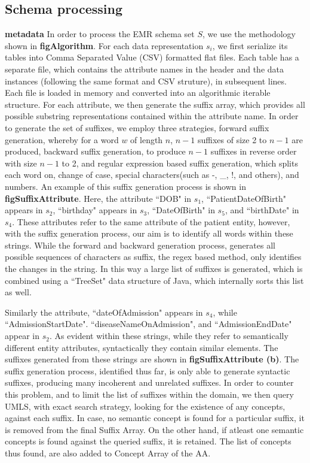 \subsection*{Schema processing}
\label{schema_prepro}
\textbf{metadata}
In order to process the EMR schema set $S$, we use the methodology shown in \textbf{figAlgorithm}. For each data representation $s_i$, we first serialize its tables into Comma Separated Value (CSV) formatted flat files. Each table has a separate file, which contains the attribute names in the header and the data instances (following the same format and CSV struture), in subsequent lines. Each file is loaded in memory and converted into an algorithmic iterable structure. For each attribute, we then generate the suffix array, which provides all possible substring representations contained within the attribute name. In order to generate the set of suffixes, we employ three strategies, forward suffix generation, whereby for a word $w$ of length $n$, $n-1$ suffixes of size 2 to $n-1$ are produced, backward suffix generation, to produce $n-1$ suffixes in reverse order with size $n-1$ to 2, and regular expression based suffix generation, which splits each word on, change of case, special characters(such as -, \_, !, and others), and numbers. An example of this suffix generation process is shown in \textbf{figSuffixAttribute}. 
Here, the attribute ``DOB" in $s_1$, ``PatientDateOfBirth" appears in $s_2$, ``birthday" appears in $s_3$, ``DateOfBirth" in $s_5$, and ``birthDate" in $s_4$. These attributes refer to the same attribute of the patient entity, however, with the suffix generation process, our aim is to identify all words within these strings. While the forward and backward generation process, generates all possible sequences of characters as suffix, the regex based method, only identifies the changes in the string. In this way a large list of suffixes is generated, which is combined using a ``TreeSet" data structure of Java, which internally sorts this list as well.

Similarly the attribute, ``dateOfAdmission" appears in $s_4$, while ``AdmissionStartDate". ``diseaseNameOnAdmission", and ``AdmissionEndDate" appear in $s_2$. As evident within these strings, while they refer to semantically different entity attributes, syntactically they contain similar elements. The suffixes generated from these strings are shown in \textbf{figSuffixAttribute (b)}. The suffix generation process, identified thus far, is only able to generate syntactic suffixes, producing many incoherent and unrelated suffixes. In order to counter this problem, and to limit the list of suffixes within the domain, we then query UMLS, with exact search strategy, looking for the existence of any concepts, against each suffix. In case, no semantic concept is found for a particular suffix, it is removed from the final Suffix Array. On the other hand, if atleast one semantic concepts is found against the queried suffix, it is retained. The list of concepts thus found, are also added to Concept Array of the AA.

